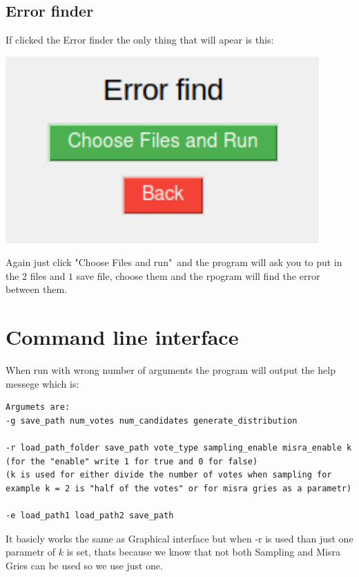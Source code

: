\documentclass[a4paper,12pt]{report}
\begin{document}
	\section{Error finder}
	
	If clicked the Error finder the only thing that will apear is this:
	
	\begin{center}
		\includegraphics[width=12cm]{error_finder.png}
	\end{center}
	
	Again just click "Choose Files and run"\ and the program will ask you to put in the $2$ files and $1$ save file, choose them and the rpogram will find the error between them.
	
	\chapter{Command line interface}
	
	When run with wrong number of arguments the program will output the help messege which is:
	
	\begin{lstlisting}
Argumets are:
-g save_path num_votes num_candidates generate_distribution

-r load_path_folder save_path vote_type sampling_enable misra_enable k
(for the "enable" write 1 for true and 0 for false)
(k is used for either divide the number of votes when sampling for example k = 2 is "half of the votes" or for misra gries as a parametr)

-e load_path1 load_path2 save_path
	\end{lstlisting}
	
	It basicly works the same as Graphical interface but when -r is used than just one parametr of $k$ is set, thats because we know that not both Sampling and Misra Gries can be used so we use just one.
	
	
	
	
	
	
\end{document}
